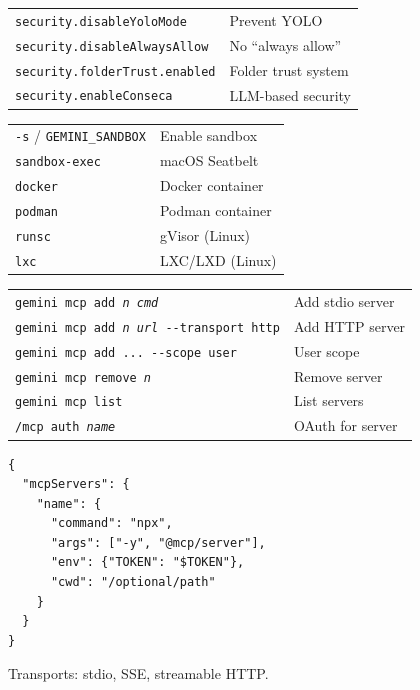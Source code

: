 \documentclass[9pt]{extarticle}
\newcommand{\sect}[1]{\needspace{4\baselineskip}\vspace{6pt}{\footnotesize\bfseries\scshape #1}\par\vspace{2pt}}
\begin{document}
\begin{multicols}{3}
\sect{Security Settings}
\begin{tabularx}{\linewidth}{@{}l@{\enspace}Y@{}}
\texttt{security.disableYoloMode}   & Prevent YOLO \\
\texttt{security.disableAlwaysAllow} & No ``always allow'' \\
\texttt{security.folderTrust.enabled} & Folder trust system \\
\texttt{security.enableConseca}     & LLM-based security \\
\end{tabularx}

\sect{Sandboxing}
\begin{tabularx}{\linewidth}{@{}l@{\enspace}Y@{}}
\texttt{-s} / \texttt{GEMINI\_SANDBOX} & Enable sandbox \\
\texttt{sandbox-exec}               & macOS Seatbelt \\
\texttt{docker}                      & Docker container \\
\texttt{podman}                      & Podman container \\
\texttt{runsc}                       & gVisor (Linux) \\
\texttt{lxc}                         & LXC/LXD (Linux) \\
\end{tabularx}

\sect{MCP Configuration}
\begin{tabularx}{\linewidth}{@{}l@{\enspace}Y@{}}
\texttt{gemini mcp add \textit{n} \textit{cmd}} & Add stdio server \\
\texttt{gemini mcp add \textit{n} \textit{url} -{}-transport http} & Add HTTP server \\
\texttt{gemini mcp add ... -{}-scope user} & User scope \\
\texttt{gemini mcp remove \textit{n}} & Remove server \\
\texttt{gemini mcp list}             & List servers \\
\texttt{/mcp auth \textit{name}}    & OAuth for server \\
\end{tabularx}

\sect{MCP Server Config}
{\footnotesize
\begin{verbatim}
{
  "mcpServers": {
    "name": {
      "command": "npx",
      "args": ["-y", "@mcp/server"],
      "env": {"TOKEN": "$TOKEN"},
      "cwd": "/optional/path"
    }
  }
}
\end{verbatim}
}
{\footnotesize Transports: stdio, SSE, streamable HTTP.}


\end{multicols}
\end{document}
